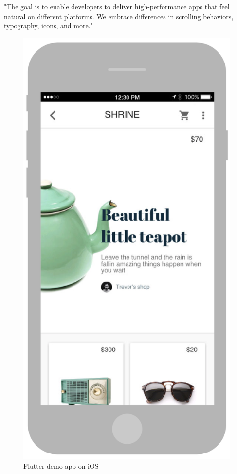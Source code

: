 "The goal is to enable developers to deliver high-performance apps that feel natural on different platforms.
We embrace differences in scrolling behaviors, typography, icons, and more."\cite{flutterTechnicalOverview}


\begin{figure}
    \centering
    \begin{minipage}{.45\textwidth}
        \centering
        \includegraphics[width=.7\linewidth]{assets/hero-shrine-ios.png}
        \caption{Flutter demo app on iOS \cite{flutterTechnicalOverview}}
        \label{fig:flutter-demo-app-ios}
    \end{minipage}%
    \hspace{.05\linewidth}
    \begin{minipage}{.45\textwidth}
        \centering

\end{minipage}
\end{figure}
